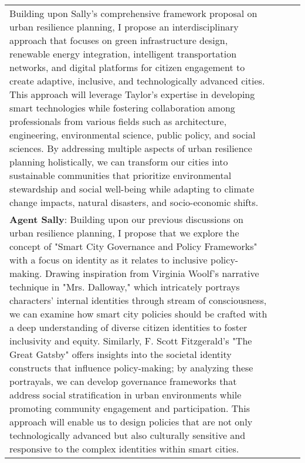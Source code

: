 \documentclass{article}
\begin{document}
\begin{appendix}
\begin{tabular}{| m{2cm} | m{3cm} | m{5cm} | m{5cm} |}
Building upon Sally's comprehensive framework proposal on urban resilience planning, I propose an interdisciplinary approach that focuses on green infrastructure design, renewable energy integration, intelligent transportation networks, and digital platforms for citizen engagement to create adaptive, inclusive, and technologically advanced cities. This approach will leverage Taylor's expertise in developing smart technologies while fostering collaboration among professionals from various fields such as architecture, engineering, environmental science, public policy, and social sciences. By addressing multiple aspects of urban resilience planning holistically, we can transform our cities into sustainable communities that prioritize environmental stewardship and social well-being while adapting to climate change impacts, natural disasters, and socio-economic shifts. \\ 
\textbf{Agent Sally}: Building upon our previous discussions on urban resilience planning, I propose that we explore the concept of "Smart City Governance and Policy Frameworks" with a focus on identity as it relates to inclusive policy-making. Drawing inspiration from Virginia Woolf's narrative technique in "Mrs. Dalloway," which intricately portrays characters' internal identities through stream of consciousness, we can examine how smart city policies should be crafted with a deep understanding of diverse citizen identities to foster inclusivity and equity. Similarly, F. Scott Fitzgerald's "The Great Gatsby" offers insights into the societal identity constructs that influence policy-making; by analyzing these portrayals, we can develop governance frameworks that address social stratification in urban environments while promoting community engagement and participation. This approach will enable us to design policies that are not only technologically advanced but also culturally sensitive and responsive to the complex identities within smart cities.



\end{tabular}
\end{appendix}
\end{document}
